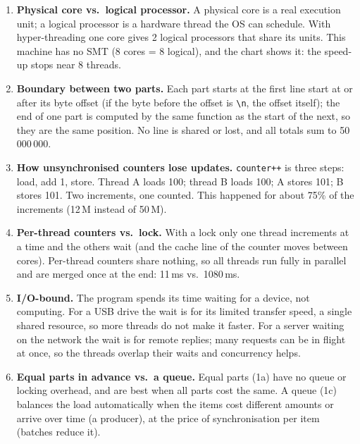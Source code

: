 \documentclass[12pt,a4paper]{article}
\newcommand{\code}[1]{\texttt{\small #1}}
\begin{document}
\begin{enumerate}
  \item \textbf{Physical core vs.\ logical processor.} A physical core is a real
        execution unit; a logical processor is a hardware thread the OS can
        schedule. With hyper-threading one core gives 2 logical processors that
        share its units. This machine has no SMT (8 cores = 8 logical), and the chart
        shows it: the speed-up stops near 8 threads.
  \item \textbf{Boundary between two parts.} Each part starts at the first
        line start at or after its byte offset (if the byte before the offset is
        \code{\textbackslash n}, the offset itself); the end of one part is
        computed by the same function as the start of the next, so they are the
        same position. No line is shared or lost, and all totals sum to 50\,000\,000.
  \item \textbf{How unsynchronised counters lose updates.} \code{counter++} is
        three steps: load, add 1, store. Thread A loads 100; thread B loads 100;
        A stores 101; B stores 101. Two increments, one counted. This happened
        for about 75\% of the increments (12\,M instead of 50\,M).
  \item \textbf{Per-thread counters vs.\ lock.} With a lock only one thread
        increments at a time and the others wait (and the cache line of the
        counter moves between cores). Per-thread counters share nothing, so
        all threads run fully in parallel and are merged once at the end:
        11\,ms vs.\ 1080\,ms.
  \item \textbf{I/O-bound.} The program spends its time waiting for a device, not
        computing. For a USB drive the wait is for its limited transfer speed, a
        single shared resource, so more threads do not make it faster. For a
        server waiting on the network the wait is for remote replies; many
        requests can be in flight at once, so the threads overlap their waits
        and concurrency helps.
  \item \textbf{Equal parts in advance vs.\ a queue.} Equal parts (1a) have no
        queue or locking overhead, and are best when all parts cost the same.
        A queue (1c) balances the load automatically when the items cost
        different amounts or arrive over time (a producer), at the price of
        synchronisation per item (batches reduce it).
\end{enumerate}

\appendix
\end{document}
